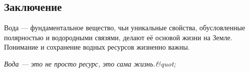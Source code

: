 \documentclass{article}
\begin{document}
\begin{preview}
\section{Заключение}
Вода — фундаментальное вещество, чьи уникальные свойства, обусловленные полярностью и водородными связями, делают её основой жизни на Земле. Понимание и сохранение водных ресурсов жизненно важны.

\vspace{1cm}
\begin{center}
    {\itshape Вода — это не просто ресурс, это сама жизнь.&quot;}
\end{center}
\end{preview}
\end{document}
